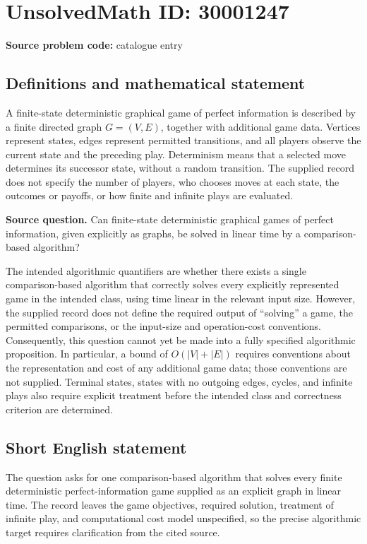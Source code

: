 \documentclass[11pt]{article}
\begin{document}
\section*{UnsolvedMath ID: 30001247}
\textbf{Source problem code:} catalogue entry
\subsection{Definitions and mathematical statement}
A finite-state deterministic graphical game of perfect information is described by a finite directed graph \(G=(V,E)\), together with additional game data. Vertices represent states, edges represent permitted transitions, and all players observe the current state and the preceding play. Determinism means that a selected move determines its successor state, without a random transition. The supplied record does not specify the number of players, who chooses moves at each state, the outcomes or payoffs, or how finite and infinite plays are evaluated.

\textbf{Source question.} Can finite-state deterministic graphical games of perfect information, given explicitly as graphs, be solved in linear time by a comparison-based algorithm?

The intended algorithmic quantifiers are whether there exists a single comparison-based algorithm that correctly solves every explicitly represented game in the intended class, using time linear in the relevant input size. However, the supplied record does not define the required output of ``solving'' a game, the permitted comparisons, or the input-size and operation-cost conventions. Consequently, this question cannot yet be made into a fully specified algorithmic proposition. In particular, a bound of \(O(|V|+|E|)\) requires conventions about the representation and cost of any additional game data; those conventions are not supplied. Terminal states, states with no outgoing edges, cycles, and infinite plays also require explicit treatment before the intended class and correctness criterion are determined.
\subsection{Short English statement}
The question asks for one comparison-based algorithm that solves every finite deterministic perfect-information game supplied as an explicit graph in linear time. The record leaves the game objectives, required solution, treatment of infinite play, and computational cost model unspecified, so the precise algorithmic target requires clarification from the cited source.
\end{document}
